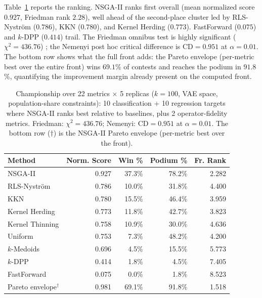 \documentclass[10pt,journal]{IEEEtran}
\newcommand{\1}{\mathbf{1}}
\theoremstyle{ieeethm}
\begin{document}
Table~\ref{tab:championship} reports the ranking. NSGA-II ranks first overall (mean normalized score $0.927$, Friedman rank $2.28$), well ahead of the second-place cluster led by RLS-Nyström ($0.786$), KKN ($0.780$), and Kernel Herding ($0.773$). FastForward ($0.075$) and $k$-DPP ($0.414$) trail. The Friedman omnibus test is highly significant ($\chi^2=436.76$) \cite{demsar2006}; the Nemenyi post hoc critical difference is $\mathrm{CD}=0.951$ at $\alpha=0.01$. The bottom row shows what the full front adds: the Pareto envelope (per-metric best over the entire front) wins $69.1$\% of contests and reaches the podium in $91.8$\%, quantifying the improvement margin already present on the computed front.

\begin{table}[t]
\centering
\caption{Championship over 22 metrics $\times$ 5 replicas ($k=100$, VAE space, population-share constraints): 10 classification + 10 regression targets where NSGA-II ranks best relative to baselines, plus 2 operator-fidelity metrics. Friedman: $\chi^2 = 436.76$; Nemenyi: $\mathrm{CD}= 0.951$ at $\alpha=0.01$. The bottom row ($\dagger$) is the NSGA-II Pareto envelope (per-metric best over the front).}
\label{tab:championship}
\small
\begin{tabular}{@{}l r r r r@{}}
\toprule
Method & Norm. Score & Win \% & Podium \% & Fr. Rank \\
\midrule
NSGA-II          & 0.927 & 37.3\% & 78.2\% & 2.282 \\
RLS-Nyström      & 0.786 & 10.0\% & 31.8\% & 4.400 \\
KKN              & 0.780 & 15.5\% & 46.4\% & 3.959 \\
Kernel Herding   & 0.773 & 11.8\% & 42.7\% & 3.823 \\
Kernel Thinning  & 0.758 & 10.9\% & 30.0\% & 4.636 \\
Uniform          & 0.753 &  7.3\% & 48.2\% & 4.200 \\
$k$-Medoids      & 0.696 &  4.5\% & 15.5\% & 5.773 \\
$k$-DPP          & 0.414 &  1.8\% &  4.5\% & 7.405 \\
FastForward      & 0.075 &  0.0\% &  1.8\% & 8.523 \\
\midrule
Pareto envelope$^\dagger$ & 0.981 & 69.1\% & 91.8\% & 1.518 \\
\bottomrule
\end{tabular}
\end{table}
\end{document}
